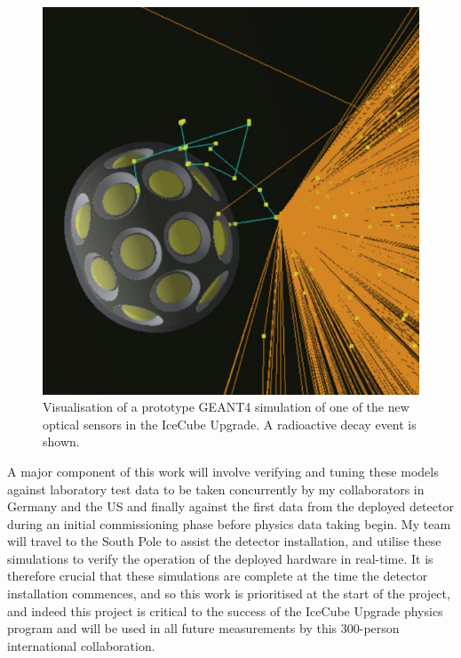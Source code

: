 \documentclass[a4paper,11pt]{article}
\begin{document}
\begin{figure} %
    \centering
    \includegraphics[trim=0.0cm 0.0cm 0.cm 1.0cm, clip=true, width=\linewidth]{images/mDOM_noise.png}
    \caption{Visualisation of a prototype GEANT4 simulation of one of the new optical sensors in the IceCube Upgrade. A radioactive decay event is shown.}
    \label{fig:mDOM_sim}
\end{figure}

A major component of this work will involve verifying and tuning these models against laboratory test data to be taken concurrently by my collaborators in Germany and the US and finally against the first data from the deployed detector during an initial commissioning phase before physics data taking begin. My team will travel to the South Pole to assist the detector installation, and utilise these simulations to verify the operation of the deployed hardware in real-time. It is therefore crucial that these simulations are complete at the time the detector installation commences, and so this work is prioritised at the start of the project, and indeed this project is critical to the success of the IceCube Upgrade physics program and will be used in all future measurements by this 300-person international collaboration.  
\end{document}
